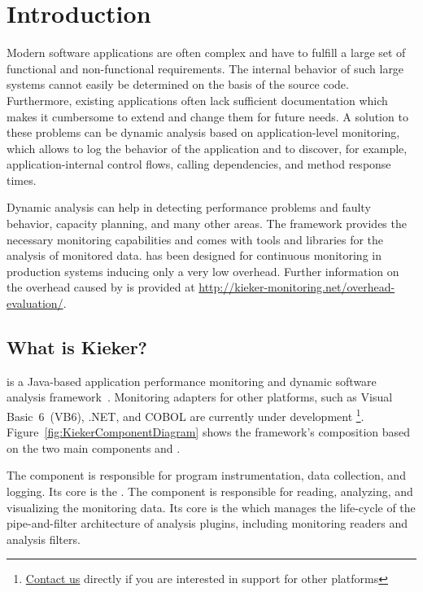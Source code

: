 \chapter{Introduction}\label{chp:Introduction}

	Modern software applications are often complex and have to fulfill a large set of functional and non-functional requirements. The internal behavior of such large systems cannot easily be determined on the basis of the source code. Furthermore, existing applications often lack sufficient documentation which makes it cumbersome to extend and change them for future needs. A solution to these problems can be dynamic analysis based on application-level monitoring, which allows to log the behavior of the application and to discover, for example, application-internal control flows, calling dependencies, and method response times.

	Dynamic analysis can help in detecting performance problems and faulty behavior, capacity planning, and many other areas. The \Kieker{} framework provides the necessary monitoring capabilities and comes with tools and libraries for the analysis of monitored data. \Kieker{} has been designed for continuous monitoring in production systems inducing only a very low overhead. Further information on the overhead caused by \Kieker{} is provided at \url{http://kieker-monitoring.net/overhead-evaluation/}.
	
	\vspace{1cm}

	
	\section{What is Kieker?}
		\Kieker{} is a Java-based application performance monitoring and dynamic software analysis framework~\cite{KiekerICPE2012}. Monitoring adapters for other platforms, such as Visual Basic~6~(VB6), .NET, and COBOL are currently under development \footnote{\href{http://kieker-monitoring.net/support/}{Contact us} directly if you are interested in \Kieker{} support for other platforms}. Figure~\ref{fig:KiekerComponentDiagram} shows the framework's composition based on the two main components \KiekerMonitoringPart{} and \KiekerAnalysisPart{}.

		The \KiekerMonitoringPart{} component is responsible for program instrumentation, data collection, and logging. Its core is the . The component \KiekerAnalysisPart{} is responsible for reading, analyzing, and visualizing the monitoring data. Its core is the  which manages the life-cycle of the pipe-and-filter architecture of analysis plugins, including monitoring readers and  analysis filters.
	
